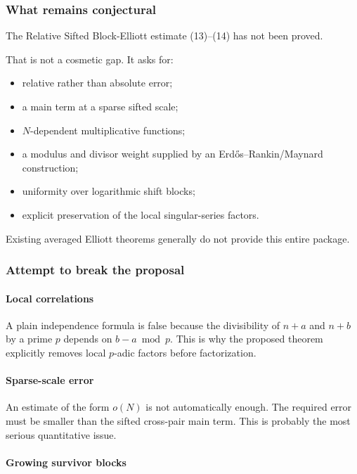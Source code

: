 \subsubsection*{What remains conjectural}

The Relative Sifted Block-Elliott estimate (13)–(14) has not been proved.

That is not a cosmetic gap. It asks for:

\begin{itemize}
\item relative rather than absolute error;
\item a main term at a sparse sifted scale;
\item \(N\)-dependent multiplicative functions;
\item a modulus and divisor weight supplied by an Erdős–Rankin/Maynard construction;
\item uniformity over logarithmic shift blocks;
\item explicit preservation of the local singular-series factors.
\end{itemize}

Existing averaged Elliott theorems generally do not provide this entire package.

\subsubsection*{Attempt to break the proposal}

\paragraph{Local correlations}

A plain independence formula is false because the divisibility of \(n+a\) and \(n+b\) by a prime \(p\) depends on \(b-a\bmod p\). This is why the proposed theorem explicitly removes local \(p\)-adic factors before factorization.

\paragraph{Sparse-scale error}

An estimate of the form \(o(N)\) is not automatically enough. The required error must be smaller than the sifted cross-pair main term. This is probably the most serious quantitative issue.

\paragraph{Growing survivor blocks}

